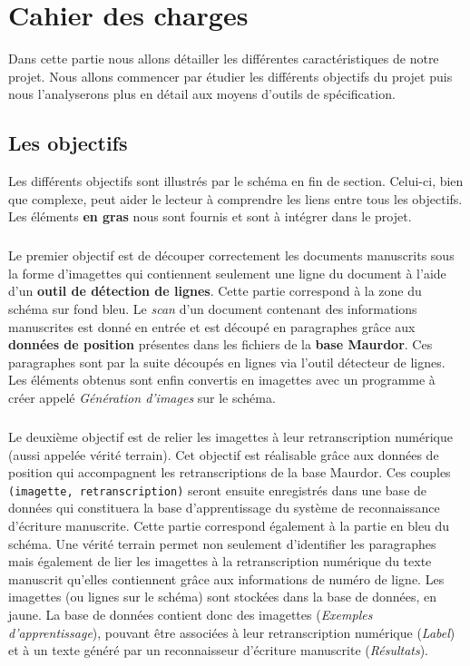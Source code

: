 \chapter{Cahier des charges}

Dans cette partie nous allons détailler les différentes caractéristiques
de notre projet. Nous allons commencer par étudier les différents objectifs
du projet puis nous l’analyserons plus en détail aux moyens d’outils de spécification.

\section{Les objectifs}

Les différents objectifs sont illustrés par le schéma en fin de section. Celui-ci,
bien que complexe, peut aider le lecteur à comprendre les liens entre tous les objectifs.
Les éléments \textbf{en gras} nous sont fournis et sont à intégrer dans le projet.

\paragraph{}
Le premier objectif est de découper correctement les documents manuscrits sous la forme
d’imagettes qui contiennent seulement une ligne du document à l’aide d’un
\textbf{outil de détection de lignes}. Cette partie correspond à la zone du schéma sur fond bleu.
Le \textit{scan} d’un document contenant des informations manuscrites est donné en entrée et est découpé en paragraphes
grâce aux \textbf{données de position} présentes dans les fichiers de la \textbf{base Maurdor}. Ces
paragraphes sont par la suite découpés en lignes via l’outil détecteur de lignes. Les éléments obtenus
sont enfin convertis en imagettes avec un programme à créer appelé \textit{Génération d’images} sur le schéma.

\paragraph{}
Le deuxième objectif est de relier les imagettes à leur retranscription numérique
(aussi appelée vérité terrain). Cet objectif est réalisable grâce aux données de position
qui accompagnent les retranscriptions de la base Maurdor. Ces couples \texttt{(imagette, retranscription)}
seront ensuite enregistrés dans une base de données qui constituera la base d’apprentissage du
système de reconnaissance d’écriture manuscrite. Cette partie correspond également à la partie
en bleu du schéma. Une vérité terrain permet non seulement d’identifier les paragraphes mais
également de lier les imagettes à la retranscription numérique du texte manuscrit qu’elles contiennent
grâce aux informations de numéro de ligne. Les imagettes (ou lignes sur le schéma) sont stockées
dans la base de données, en jaune. La base de données contient donc des imagettes (\textit{Exemples d’apprentissage}),
pouvant être associées à leur retranscription numérique (\textit{Label}) et à un texte généré par un
reconnaisseur d’écriture manuscrite (\textit{Résultats}).

